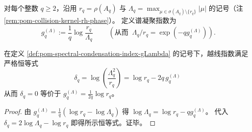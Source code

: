 
\begin{definition}[谱凝聚指数]\label{def:pom-spectral-condensation-index-gLambda}
对每个整数 \(q\ge 2\)，沿用 \(r_q=\rho(A_q)\) 与
\(
\Lambda_q=\max_{\mu\in\sigma(A_q)\setminus\{r_q\}}|\mu|
\)
的记号（注 \ref{rem:pom-collision-kernel-rh-phase}）。
定义谱凝聚指数为
\[
\boxed{\;
g_q^{(\Lambda)}:=\frac{1}{q}\log\frac{r_q}{\Lambda_q}\;}
\qquad(\text{从而 }\ \Lambda_q/r_q=\exp(-qg_q^{(\Lambda)})).
\]
\end{definition}

\begin{corollary}\label{cor:pom-deltaq-gLambda-identity}
在定义 \ref{def:pom-spectral-condensation-index-gLambda} 的记号下，越线指数满足严格恒等式
\[
\boxed{\;
\delta_q=\log\!\left(\frac{\Lambda_q^2}{r_q}\right)=\log r_q-2q\,g_q^{(\Lambda)}\;}
\]
从而 \(\delta_q=0\) 等价于 \(g_q^{(\Lambda)}=\frac{1}{2q}\log r_q\)。
\end{corollary}
\begin{proof}
由 \(g_q^{(\Lambda)}=\frac{1}{q}(\log r_q-\log\Lambda_q)\) 得 \(\log\Lambda_q=\log r_q-qg_q^{(\Lambda)}\)。
代入 \(\delta_q=2\log\Lambda_q-\log r_q\) 即得所示恒等式。证毕。
\end{proof}

